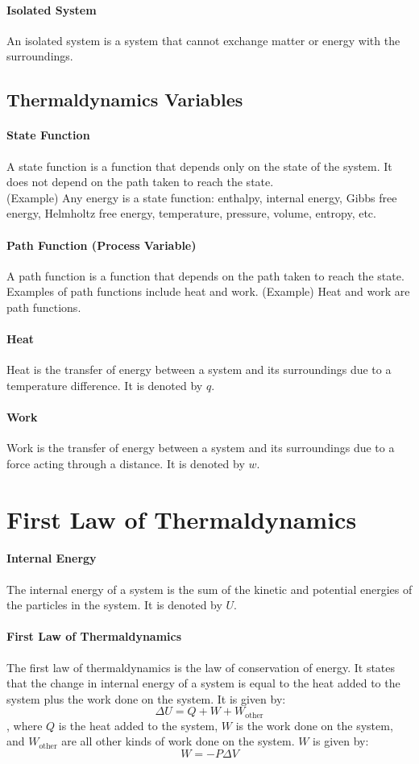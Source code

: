 \documentclass[11pt]{report}
\begin{document}
\paragraph{Isolated System} An isolated system is a system that cannot exchange matter or energy with the surroundings.
\subsection{Thermaldynamics Variables}
\paragraph{State Function} A state function is a function that depends only on the state of the system. It does not depend on the path taken to reach the state. \\
(Example) Any energy is a state function: enthalpy, internal energy, Gibbs free energy, Helmholtz free energy, temperature, pressure, volume, entropy, etc.
\paragraph{Path Function (Process Variable)} A path function is a function that depends on the path taken to reach the state. Examples of path functions include heat and work.
(Example) Heat and work are path functions.
\paragraph{Heat} Heat is the transfer of energy between a system and its surroundings due to a temperature difference. It is denoted by $q$.
\paragraph{Work} Work is the transfer of energy between a system and its surroundings due to a force acting through a distance. It is denoted by $w$.
\section{First Law of Thermaldynamics}
\paragraph{Internal Energy} The internal energy of a system is the sum of the kinetic and potential energies of the particles in the system. It is denoted by $U$.
\paragraph{First Law of Thermaldynamics} The first law of thermaldynamics is the law of conservation of energy. It states that the change in internal energy of a system is equal to the heat added to the system plus the work done on the system. It is given by:
\begin{equation}
    \Delta U = Q + W + W_{\text{other}}
\end{equation}
, where $Q$ is the heat added to the system, $W$ is the work done on the system, and $W_{\text{other}}$ are all other kinds of work done on the system. $W$ is given by:
\begin{equation}
    W = -P\Delta V
\end{equation}
\end{document}
